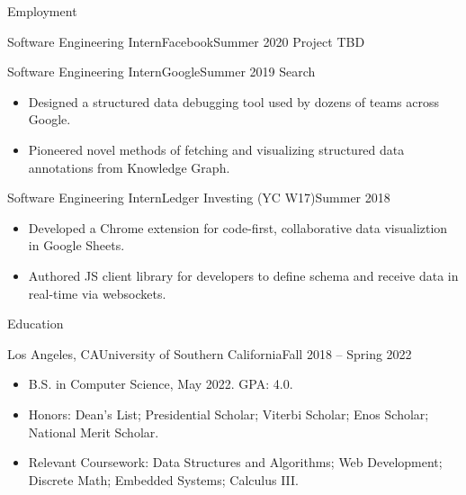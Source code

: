 \documentclass[calibri]{mcdowellcv}
\begin{document}
\makeheader

\begin{cvsection}{Employment}
	\begin{cvsubsection}{Software Engineering Intern}{Facebook}{Summer 2020}
		Project TBD
	\end{cvsubsection}

	\begin{cvsubsection}{Software Engineering Intern}{Google}{Summer 2019}
		Search
		\begin{itemize}
			\item Designed a structured data debugging tool used by dozens of teams across Google.
			\item Pioneered novel methods of fetching and visualizing structured data annotations from Knowledge Graph.
		\end{itemize}
	\end{cvsubsection}

	\begin{cvsubsection}{Software Engineering Intern}{Ledger Investing (YC W17)}{Summer 2018}
		\begin{itemize}
			\item Developed a Chrome extension for code-first, collaborative data visualiztion in Google Sheets.
			\item Authored JS client library for developers to define schema and receive data in real-time via websockets.
		\end{itemize}
	\end{cvsubsection}
\end{cvsection}

\begin{cvsection}{Education}
	\begin{cvsubsection}{Los Angeles, CA}{University of Southern California}{Fall 2018 -- Spring 2022}
		\begin{itemize}
			\item B.S. in Computer Science, May 2022.  GPA: 4.0.
			\item Honors: Dean's List; Presidential Scholar; Viterbi Scholar; Enos Scholar; National Merit Scholar.
			\item Relevant Coursework: Data Structures and Algorithms; Web Development; Discrete Math; Embedded Systems; Calculus III.
		\end{itemize}
	\end{cvsubsection}
\end{cvsection}
\end{document}

